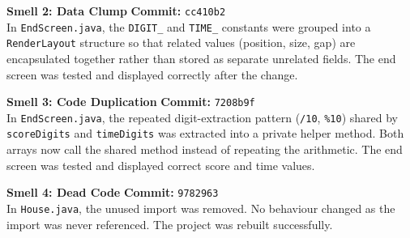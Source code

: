 \documentclass[10pt]{article}
\begin{document}
\textbf{Smell 2: Data Clump} \quad \textbf{Commit:} \texttt{cc410b2} \\
In \texttt{EndScreen.java}, the \texttt{DIGIT\_} and \texttt{TIME\_} constants 
were grouped into a \texttt{RenderLayout} structure so that related values 
(position, size, gap) are encapsulated together rather than stored as separate 
unrelated fields. The end screen was tested and displayed correctly after the change.

\textbf{Smell 3: Code Duplication} \quad \textbf{Commit:} \texttt{7208b9f} \\
In \texttt{EndScreen.java}, the repeated digit-extraction pattern (\texttt{/10}, 
\texttt{\%10}) shared by \texttt{scoreDigits} and \texttt{timeDigits} was 
extracted into a private helper method. Both arrays now call the shared method 
instead of repeating the arithmetic. The end screen was tested and displayed 
correct score and time values.

\textbf{Smell 4: Dead Code} \quad \textbf{Commit:} \texttt{9782963} \\
In \texttt{House.java}, the unused import was removed. No behaviour changed 
as the import was never referenced. The project was rebuilt successfully.
\end{document}
